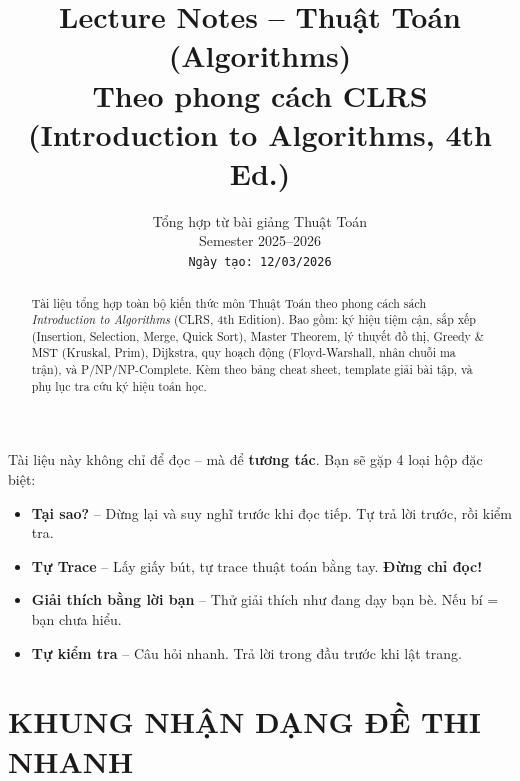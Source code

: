 \documentclass[10pt]{article}
\title{Lecture Notes -- Thuật Toán (Algorithms) \\
\large Theo phong cách CLRS (Introduction to Algorithms, 4th Ed.)}
\author{
  Tổng hợp từ bài giảng Thuật Toán \\
  Semester 2025--2026 \\
  \texttt{Ngày tạo: 12/03/2026}
}
\date{}
\providecommand{\tightlist}{\setlength{\itemsep}{0pt}\setlength{\parskip}{0pt}}
\begin{document}
\maketitle

\begin{abstract}
Tài liệu tổng hợp toàn bộ kiến thức môn Thuật Toán theo phong cách sách \textit{Introduction to Algorithms} (CLRS, 4th Edition). Bao gồm: ký hiệu tiệm cận, sắp xếp (Insertion, Selection, Merge, Quick Sort), Master Theorem, lý thuyết đồ thị, Greedy \& MST (Kruskal, Prim), Dijkstra, quy hoạch động (Floyd-Warshall, nhân chuỗi ma trận), và P/NP/NP-Complete. Kèm theo bảng cheat sheet, template giải bài tập, và phụ lục tra cứu ký hiệu toán học.
\end{abstract}


\vspace{0.5cm}

\begin{tcolorbox}[colback=gray!5!white, colframe=gray!60!black,
  title={\textbf{\large Cách sử dụng tài liệu này -- Hệ thống tự học}},
  fonttitle=\bfseries, coltitle=white, colbacktitle=gray!70!black]

Tài liệu này không chỉ để đọc -- mà để \textbf{tương tác}. Bạn sẽ gặp 4 loại hộp đặc biệt:

\begin{itemize}
\tightlist
\item \textcolor{orange!80!black}{\textbf{Tại sao?}} -- Dừng lại và suy nghĩ trước khi đọc tiếp. Tự trả lời trước, rồi kiểm tra.
\item \textcolor{green!60!black}{\textbf{Tự Trace}} -- Lấy giấy bút, tự trace thuật toán bằng tay. \textbf{Đừng chỉ đọc!}
\item \textcolor{violet!80!black}{\textbf{Giải thích bằng lời bạn}} -- Thử giải thích như đang dạy bạn bè. Nếu bí = bạn chưa hiểu.
\item \textcolor{orange!80!black}{\textbf{Tự kiểm tra}} -- Câu hỏi nhanh. Trả lời trong đầu trước khi lật trang.
\end{itemize}
\end{tcolorbox}


\section*{KHUNG NHẬN DẠNG ĐỀ THI NHANH}\label{khung-nhux1eadn-dux1ea1ng-ux111ux1ec1-thi-nhanh}
\end{document}
